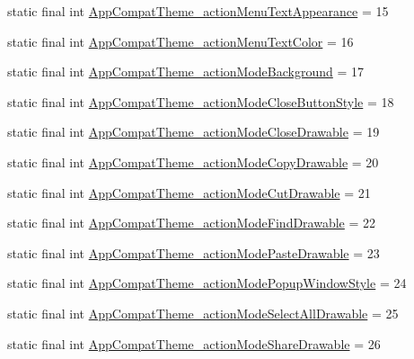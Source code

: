 \begin{DoxyCompactItemize}
\item 
static final int \mbox{\hyperlink{classandroid_1_1support_1_1design_1_1_r_1_1styleable_ad68a09beb02879ae2543dcc641682725}{App\+Compat\+Theme\+\_\+action\+Menu\+Text\+Appearance}} = 15
\item 
static final int \mbox{\hyperlink{classandroid_1_1support_1_1design_1_1_r_1_1styleable_a7826d96ee46d31f0fa72310dc6273682}{App\+Compat\+Theme\+\_\+action\+Menu\+Text\+Color}} = 16
\item 
static final int \mbox{\hyperlink{classandroid_1_1support_1_1design_1_1_r_1_1styleable_a1b5697312f95195a23a9337e9a0b5083}{App\+Compat\+Theme\+\_\+action\+Mode\+Background}} = 17
\item 
static final int \mbox{\hyperlink{classandroid_1_1support_1_1design_1_1_r_1_1styleable_a8418a1d6b947ad5f57f3a56af1643973}{App\+Compat\+Theme\+\_\+action\+Mode\+Close\+Button\+Style}} = 18
\item 
static final int \mbox{\hyperlink{classandroid_1_1support_1_1design_1_1_r_1_1styleable_a0d23e6043c9a37971fa8a2c2167195f8}{App\+Compat\+Theme\+\_\+action\+Mode\+Close\+Drawable}} = 19
\item 
static final int \mbox{\hyperlink{classandroid_1_1support_1_1design_1_1_r_1_1styleable_aa2e39cdddee1cff2cb530436fd7787eb}{App\+Compat\+Theme\+\_\+action\+Mode\+Copy\+Drawable}} = 20
\item 
static final int \mbox{\hyperlink{classandroid_1_1support_1_1design_1_1_r_1_1styleable_a4f3e0ecd51b5084488b4e15613ca9248}{App\+Compat\+Theme\+\_\+action\+Mode\+Cut\+Drawable}} = 21
\item 
static final int \mbox{\hyperlink{classandroid_1_1support_1_1design_1_1_r_1_1styleable_af9859e59c807eb94e56b365ea7fbe234}{App\+Compat\+Theme\+\_\+action\+Mode\+Find\+Drawable}} = 22
\item 
static final int \mbox{\hyperlink{classandroid_1_1support_1_1design_1_1_r_1_1styleable_af8ee7e0434de26514fa36a0b93b0e321}{App\+Compat\+Theme\+\_\+action\+Mode\+Paste\+Drawable}} = 23
\item 
static final int \mbox{\hyperlink{classandroid_1_1support_1_1design_1_1_r_1_1styleable_a7457a7662927f780df4d91b97e76dd3e}{App\+Compat\+Theme\+\_\+action\+Mode\+Popup\+Window\+Style}} = 24
\item 
static final int \mbox{\hyperlink{classandroid_1_1support_1_1design_1_1_r_1_1styleable_a5899f63671a5851f68757ff8c89f11e4}{App\+Compat\+Theme\+\_\+action\+Mode\+Select\+All\+Drawable}} = 25
\item 
static final int \mbox{\hyperlink{classandroid_1_1support_1_1design_1_1_r_1_1styleable_a4c5647081be9ed1ad46f91411d01c643}{App\+Compat\+Theme\+\_\+action\+Mode\+Share\+Drawable}} = 26

\end{DoxyCompactItemize}
